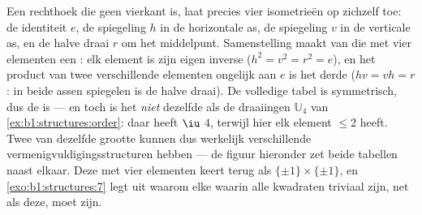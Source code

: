 \begin{example}\label{ex:b1:structures:klein}
Een rechthoek die geen vierkant is, laat precies vier isometrieën op
zichzelf toe: de identiteit $e$, de spiegeling $h$ in de horizontale as,
de spiegeling $v$ in de verticale as, en de halve draai $r$ om het
middelpunt. Samenstelling maakt van die  met vier elementen een
: elk element is zijn eigen inverse ($h^2 = v^2 = r^2 = e$), en het
product van twee verschillende elementen ongelijk aan $e$ is het derde
($hv = vh = r$: in beide assen spiegelen is de halve draai). De volledige
tabel is symmetrisch, dus de  is  --- en toch is het
\emph{niet} dezelfde  als de draaiingen $\mathbb U_4$ van
\cref{ex:b1:structures:order}: daar heeft $\iu$  $4$, terwijl hier elk
element  $\leq 2$ heeft. Twee  van dezelfde grootte kunnen dus
werkelijk verschillende vermenigvuldigingsstructuren hebben --- de figuur
hieronder zet beide tabellen naast elkaar. Deze  met vier elementen
keert terug als $\{\pm1\} \times \{\pm1\}$, en
\cref{exo:b1:structures:7} legt uit waarom elke  waarin alle
kwadraten triviaal zijn, net als deze,  moet zijn.
\end{example}

